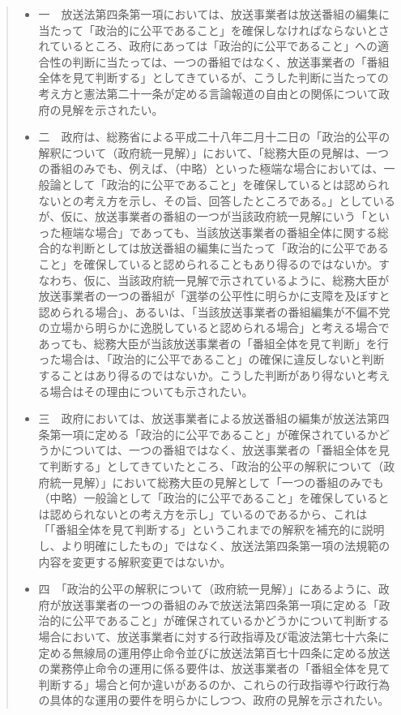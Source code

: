 \begin{quote}
  \begin{itemize}
    \item 一　放送法第四条第一項においては、放送事業者は放送番組の編集に当たって「政治的に公平であること」を確保しなければならないとされているところ、政府にあっては「政治的に公平であること」への適合性の判断に当たっては、一つの番組ではなく、放送事業者の「番組全体を見て判断する」としてきているが、こうした判断に当たっての考え方と憲法第二十一条が定める言論報道の自由との関係について政府の見解を示されたい。

    \item 二　政府は、総務省による平成二十八年二月十二日の「政治的公平の解釈について（政府統一見解）」において、「総務大臣の見解は、一つの番組のみでも、例えば、（中略）といった極端な場合においては、一般論として「政治的に公平であること」を確保しているとは認められないとの考え方を示し、その旨、回答したところである。」としているが、仮に、放送事業者の番組の一つが当該政府統一見解にいう「といった極端な場合」であっても、当該放送事業者の番組全体に関する総合的な判断としては放送番組の編集に当たって「政治的に公平であること」を確保していると認められることもあり得るのではないか。すなわち、仮に、当該政府統一見解で示されているように、総務大臣が放送事業者の一つの番組が「選挙の公平性に明らかに支障を及ぼすと認められる場合」、あるいは、「当該放送事業者の番組編集が不偏不党の立場から明らかに逸脱していると認められる場合」と考える場合であっても、総務大臣が当該放送事業者の「番組全体を見て判断」を行った場合は、「政治的に公平であること」の確保に違反しないと判断することはあり得るのではないか。こうした判断があり得ないと考える場合はその理由についても示されたい。

    \item 三　政府においては、放送事業者による放送番組の編集が放送法第四条第一項に定める「政治的に公平であること」が確保されているかどうかについては、一つの番組ではなく、放送事業者の「番組全体を見て判断する」としてきていたところ、「政治的公平の解釈について（政府統一見解）」において総務大臣の見解として「一つの番組のみでも（中略）一般論として「政治的に公平であること」を確保しているとは認められないとの考え方を示し」ているのであるから、これは「「番組全体を見て判断する」というこれまでの解釈を補充的に説明し、より明確にしたもの」ではなく、放送法第四条第一項の法規範の内容を変更する解釈変更ではないか。

    \item 四　「政治的公平の解釈について（政府統一見解）」にあるように、政府が放送事業者の一つの番組のみで放送法第四条第一項に定める「政治的に公平であること」が確保されているかどうかについて判断する場合において、放送事業者に対する行政指導及び電波法第七十六条に定める無線局の運用停止命令並びに放送法第百七十四条に定める放送の業務停止命令の運用に係る要件は、放送事業者の「番組全体を見て判断する」場合と何か違いがあるのか、これらの行政指導や行政行為の具体的な運用の要件を明らかにしつつ、政府の見解を示されたい。


\end{itemize}
\end{quote}
